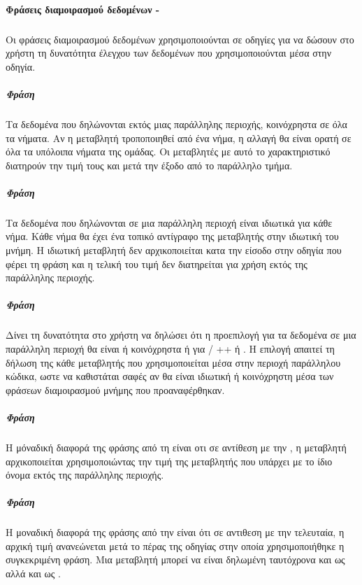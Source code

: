 \paragraph{Φράσεις διαμοιρασμού δεδομένων - }
\subparagraph{}
Οι φράσεις διαμοιρασμού δεδομένων χρησιμοποιούνται σε οδηγίες για να δώσουν στο χρήστη τη δυνατότητα έλεγχου των δεδομένων που χρησιμοποιούνται μέσα στην οδηγία.

\subparagraph{Φράση \emph{}}
\subparagraph{}
Τα δεδομένα που δηλώνονται εκτός μιας παράλληλης περιοχής, κοινόχρηστα σε όλα τα νήματα. Αν η μεταβλητή τροποποιηθεί από ένα νήμα, η αλλαγή θα είναι ορατή σε όλα τα υπόλοιπα νήματα της ομάδας. Οι μεταβλητές με αυτό το χαρακτηριστικό διατηρούν την τιμή τους και μετά την έξοδο από το παράλληλο τμήμα.

\subparagraph{Φράση \emph{}}
\subparagraph{}
Τα δεδομένα που δηλώνονται σε μια παράλληλη περιοχή είναι ιδιωτικά για κάθε νήμα. Κάθε νήμα θα έχει ένα τοπικό αντίγραφο της μεταβλητής στην ιδιωτική του μνήμη. Η ιδιωτική μεταβλητή δεν αρχικοποιείται κατα την είσοδο στην οδηγία που φέρει τη φράση \emph{} και η τελική του τιμή δεν διατηρείται για χρήση εκτός της παράλληλης περιοχής.

\subparagraph{Φράση \emph{}}
\subparagraph{}
Δίνει τη δυνατότητα στο χρήστη να δηλώσει ότι η προεπιλογή για τα δεδομένα σε μια παράλληλη περιοχή θα είναι ή κοινόχρηστα ή \emph{} για  / ++ ή {}. Η επιλογή \emph{} απαιτεί τη δήλωση της κάθε μεταβλητής που χρησιμοποιείται μέσα στην περιοχή παράλληλου κώδικα, ωστε να καθιστάται σαφές αν θα είναι ιδιωτική ή κοινόχρηστη μέσα των φράσεων διαμοιρασμού μνήμης που προαναφέρθηκαν.

\subparagraph{Φράση \emph{}}
\subparagraph{}
Η μόναδική διαφορά της φράσης \emph{} από τη \emph{} είναι οτι σε αντίθεση με την \emph{}, η μεταβλητή αρχικοποιείται χρησιμοποιώντας την τιμή της μεταβλητής που υπάρχει με το ίδιο όνομα εκτός της παράλληλης περιοχής.

\subparagraph{Φράση \emph{}}
\subparagraph{}
Η μοναδική διαφορά της φράσης \emph{} από την \emph{} είναι ότι σε αντιθεση με την τελευταία, η αρχική τιμή ανανεώνεται μετά το πέρας της οδηγίας στην οποία χρησιμοποιήθηκε η συγκεκριμένη φράση. Μια μεταβλητή μπορεί να είναι δηλωμένη ταυτόχρονα και ως \emph{} αλλά και ως \emph{}.

